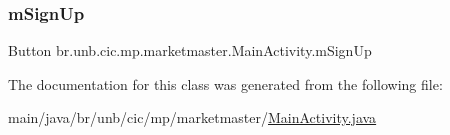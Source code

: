 \subsubsection{\texorpdfstring{m\+Sign\+Up}{mSignUp}}
{\footnotesize\ttfamily Button br.\+unb.\+cic.\+mp.\+marketmaster.\+Main\+Activity.\+m\+Sign\+Up\hspace{0.3cm}{\ttfamily [private]}}



The documentation for this class was generated from the following file\+:\begin{DoxyCompactItemize}
\item 
main/java/br/unb/cic/mp/marketmaster/\mbox{\hyperlink{MainActivity_8java}{Main\+Activity.\+java}}\end{DoxyCompactItemize}
